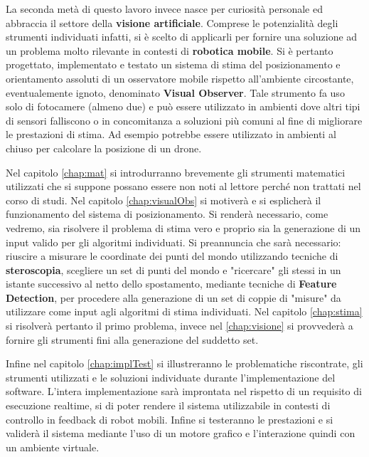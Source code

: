 La seconda metà di questo lavoro invece nasce per curiosità personale ed abbraccia il settore della \textbf{visione artificiale}. Comprese le potenzialità degli strumenti individuati infatti, si è scelto di applicarli per fornire una soluzione ad un problema molto rilevante in contesti di \textbf{robotica mobile}. Si è pertanto progettato, implementato e testato un sistema di stima del posizionamento e orientamento assoluti di un osservatore mobile rispetto all'ambiente circostante, eventualemente ignoto, denominato \textbf{Visual Observer}. Tale strumento fa uso solo di fotocamere (almeno due) e può essere utilizzato in ambienti dove altri tipi di sensori falliscono o in concomitanza a soluzioni più comuni al fine di migliorare le prestazioni di stima. Ad esempio potrebbe essere utilizzato in ambienti al chiuso per calcolare la posizione di un drone.

Nel capitolo \ref{chap:mat} si introdurranno brevemente gli strumenti matematici utilizzati che si suppone possano essere non noti al lettore perché non trattati nel corso di studi.
Nel capitolo \ref{chap:visualObs} si motiverà e si esplicherà il funzionamento del sistema di posizionamento. Si renderà necessario, come vedremo, sia risolvere il problema di stima vero e proprio sia la generazione di un input valido per gli algoritmi individuati. Si preannuncia che sarà necessario: riuscire a misurare le coordinate dei punti del mondo utilizzando tecniche di \textbf{steroscopia}, scegliere un set di punti del mondo e "ricercare" gli stessi in un istante successivo al netto dello spostamento, mediante tecniche di \textbf{Feature Detection}, per procedere alla generazione di un set di coppie di "misure" da utilizzare come input agli algoritmi di stima individuati. Nel capitolo \ref{chap:stima} si risolverà pertanto il primo problema, invece nel \ref{chap:visione} si provvederà a fornire gli strumenti fini alla generazione del suddetto set.

Infine nel capitolo \ref{chap:implTest} si illustreranno le problematiche riscontrate, gli strumenti utilizzati e le soluzioni individuate durante l'implementazione del software. L'intera implementazione sarà improntata nel rispetto di un requisito di esecuzione realtime, si di poter rendere il sistema utilizzabile in contesti di controllo in feedback di robot mobili. Infine si testeranno le prestazioni e si validerà il sistema mediante l'uso di un motore grafico e l'interazione quindi con un ambiente virtuale.  